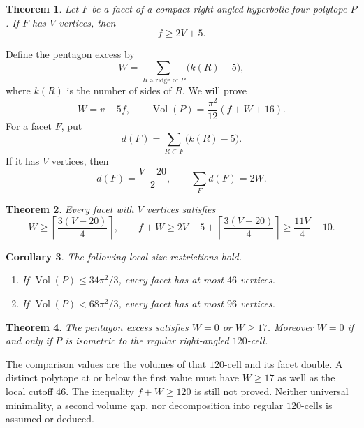 \documentclass[11pt]{article}
\newtheorem{theorem}{Theorem}
\newtheorem{corollary}[theorem]{Corollary}
\theoremstyle{remark}
\newcommand{\Vol}{\operatorname{Vol}}
\begin{document}
\begin{theorem}\label{thm:capacity}
Let $F$ be a facet of a compact right-angled hyperbolic four-polytope
$P$. If $F$ has $V$ vertices, then
\begin{equation}\label{eq:capacity}
 f\ge 2V+5.
\end{equation}
\end{theorem}

Define the pentagon excess by
\[
 W=\sum_{R\text{ a ridge of }P}\bigl(k(R)-5\bigr),
\]
where $k(R)$ is the number of sides of $R$. We will prove
\begin{equation}\label{eq:volume}
 W=v-5f,\qquad
 \Vol(P)=\frac{\pi^2}{12}(f+W+16).
\end{equation}
For a facet $F$, put
\[
 d(F)=\sum_{R\subset F}\bigl(k(R)-5\bigr).
\]
If it has $V$ vertices, then
\begin{equation}\label{eq:excess-identities}
 d(F)=\frac{V-20}{2},\qquad \sum_Fd(F)=2W.
\end{equation}

\begin{theorem}\label{thm:neighbor-excess}
Every facet with $V$ vertices satisfies
\begin{equation}\label{eq:excess-bound}
 W\ge\left\lceil\frac{3(V-20)}4\right\rceil,\qquad
 f+W\ge2V+5+\left\lceil\frac{3(V-20)}4\right\rceil
       \ge\frac{11V}4-10.
\end{equation}
\end{theorem}

\begin{corollary}\label{cor:local-size}
The following local size restrictions hold.
\begin{enumerate}
\item If $\Vol(P)\le34\pi^2/3$, every facet has at most $46$ vertices.
\item If $\Vol(P)<68\pi^2/3$, every facet has at most $96$ vertices.
\end{enumerate}
\end{corollary}

\begin{theorem}\label{thm:gap}
The pentagon excess satisfies $W=0$ or $W\ge17$. Moreover $W=0$ if
and only if $P$ is isometric to the regular right-angled $120$-cell.
\end{theorem}

The comparison values are the volumes of that $120$-cell and its facet
double. A distinct polytope at or below the first value must have
$W\ge17$ as well as the local cutoff $46$. The inequality
$f+W\ge120$ is still not proved. Neither universal minimality, a second
volume gap, nor decomposition into regular $120$-cells is assumed or
deduced.
\end{document}
